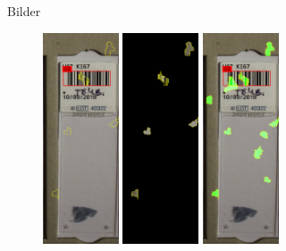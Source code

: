 \documentclass{beamer}
\begin{document}
  \begin{frame}{Bilder}
    \begin{figure}
      \includegraphics[width=0.2\textwidth]{./assets/Cell106357_2_8_top1_positiveonlywithrest.PNG}
      \hfill
      \includegraphics[width=0.2\textwidth]{./assets/Cell106357_2_8_top1_positiveonly.PNG}
      \hfill
      \includegraphics[width=0.2\textwidth]{./assets/Cell106357_2_8_top1_proscons.PNG}
      \hfill

\end{figure}
\end{frame}
\end{document}
